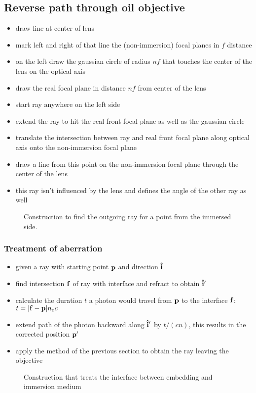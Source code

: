 \documentclass[twocolumn,DIV19]{scrartcl}
\begin{document}
\subsection{Reverse path through oil objective}
\begin{itemize}
\item draw line at center of lens
\item mark left and right of that line the (non-immersion) focal
  planes in $f$ distance
\item on the left draw the gaussian circle of radius $nf$ that touches
  the center of the lens on the optical axis
\item draw the real focal plane in distance $nf$ from center of the
  lens
\item start ray anywhere on the left side
\item extend the ray to hit the real front focal plane as well as the
  gaussian circle
\item translate the intersection between ray and real front focal
  plane along optical axis onto the non-immersion focal plane
\item draw a line from this point on the non-immersion focal plane
  through the center of the lens
\item this ray isn't influenced by the lens and defines the angle of
  the other ray as well
\end{itemize}
 \begin{figure}[!hbt]
   \centering
   
   \caption{Construction to find the outgoing ray for a point from the
     immersed side.}
 \end{figure}
\subsubsection{Treatment of aberration}
\begin{itemize}
\item given a ray with starting point $\mathbf{p}$ and direction $\mathbf{\hat{i}}$
\item find intersection $\mathbf{f}$ of ray with interface and refract to
  obtain $\mathbf{\hat{i}}'$
\item calculate the duration $t$ a photon would travel from $\mathbf{p}$ to
  the interface $\mathbf{f}$: $t=\mathopen| \mathbf{f}-\mathbf{p} \mathclose|n_ec$
\item extend path of the photon backward along $\mathbf{\hat{i}}'$ by $t/(cn)$, this
  results in the corrected position $\mathbf{p}'$
\item apply the method of the previous section to obtain the ray
  leaving the objective
\end{itemize}
 \begin{figure}[!hbt]
   \centering
   
   \caption{Construction that treats the interface between embedding
     and immersion medium}
 \end{figure}
\newpage
\end{document}
